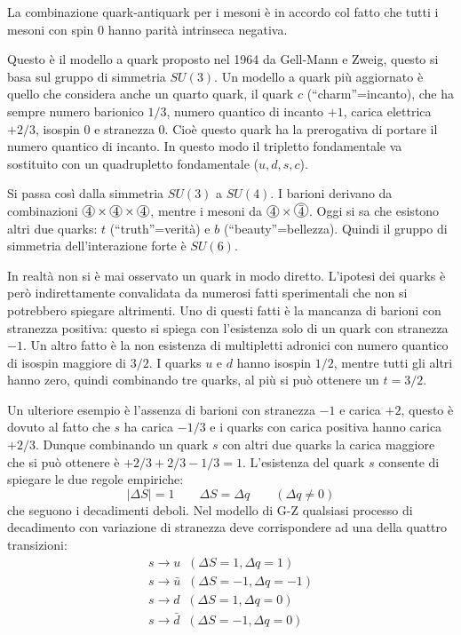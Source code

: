 La combinazione quark-antiquark per i mesoni è in accordo col fatto che tutti i mesoni con spin $0$ hanno parità
intrinseca negativa.

Questo è il modello a quark proposto nel 1964 da Gell-Mann e Zweig, questo si basa sul gruppo di simmetria
$SU(3)$. Un modello a quark più aggiornato è quello che considera anche un quarto quark, il quark $c$
(``charm''=incanto),
che ha sempre numero barionico $1/3$, numero quantico di incanto $+1$, carica elettrica $+2/3$, isospin $0$ e stranezza $0$.
Cioè questo quark ha la prerogativa di portare il numero quantico di incanto. In questo modo il tripletto
fondamentale va sostituito con un quadrupletto fondamentale ($u,d,s,c$).

Si passa così dalla simmetria $SU(3)$ a $SU(4)$. I barioni derivano da combinazioni
$\Ci{4}\times\Ci{4}\times\Ci{4}$, mentre i mesoni da $\Ci{4}\times\Ci{$\bar{4}$}$.
Oggi si sa che esistono altri due quarks: $t$ (``truth''=verità) e $b$ (``beauty''=bellezza).
Quindi il gruppo di simmetria dell'interazione forte è $SU(6)$.

In realtà non si è mai osservato un quark in modo diretto. L'ipotesi dei quarks è però indirettamente convalidata
da numerosi fatti sperimentali che non si potrebbero spiegare altrimenti.
Uno di questi fatti è la mancanza di barioni con stranezza positiva: questo si spiega con l'esistenza solo di un
quark con stranezza $-1$.
Un altro fatto è la non esistenza di multipletti adronici con numero quantico di isospin maggiore di $3/2$.
I quarks $u$ e $d$ hanno isospin $1/2$, mentre tutti gli altri hanno zero, quindi combinando tre quarks, al più si
può ottenere un $t=3/2$.

Un ulteriore esempio è l'assenza di barioni con stranezza $-1$ e carica $+2$, questo è dovuto al fatto che $s$ ha
carica $-1/3$ e i quarks con carica positiva hanno carica $+2/3$.
Dunque combinando un quark $s$ con altri due quarks la carica maggiore che si può ottenere è $+2/3+2/3-1/3=1$.
L'esistenza del quark $s$ consente di spiegare le due regole empiriche:
\[
|\Delta S|=1\qquad \Delta S=\Delta q\qquad (\Delta q\neq 0) 
\]
che seguono i decadimenti deboli.
Nel modello di G-Z qualsiasi processo di decadimento con variazione di stranezza deve corrispondere ad una
della quattro transizioni:
\begin{gather}
s\rightarrow u\;\;(\Delta S=1,\Delta q=1)\\
s\rightarrow \bar{u}\;\;(\Delta S=-1,\Delta q=-1)\\
s\rightarrow d\;\;(\Delta S=1,\Delta q=0)\\
s\rightarrow \bar{d}\;\;(\Delta S=-1,\Delta q=0)
\end{gather}

